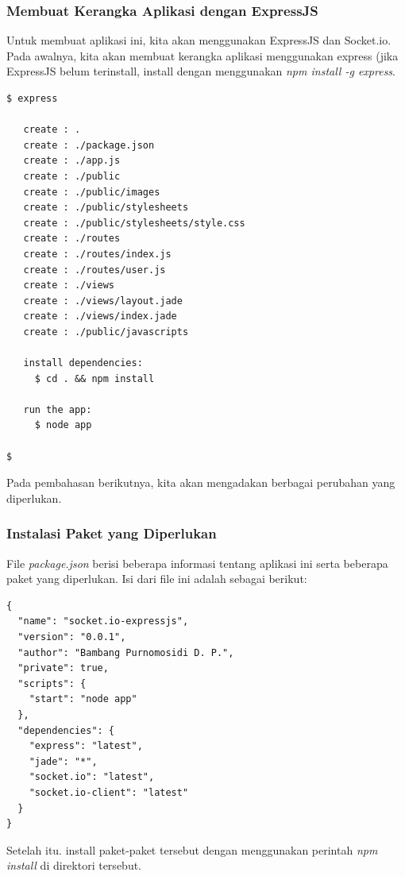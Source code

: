 \subsubsection{Membuat Kerangka Aplikasi dengan ExpressJS}

Untuk membuat aplikasi ini, kita akan menggunakan ExpressJS dan Socket.io. Pada awalnya, kita akan membuat kerangka aplikasi menggunakan express (jika ExpressJS belum terinstall, install dengan menggunakan \textit{npm install -g express}. 

\lstset{language=Bash,caption=Membuat kerangka aplikasi dengan ExpressJS}
\begin{lstlisting}
$ express 

   create : .
   create : ./package.json
   create : ./app.js
   create : ./public
   create : ./public/images
   create : ./public/stylesheets
   create : ./public/stylesheets/style.css
   create : ./routes
   create : ./routes/index.js
   create : ./routes/user.js
   create : ./views
   create : ./views/layout.jade
   create : ./views/index.jade
   create : ./public/javascripts

   install dependencies:
     $ cd . && npm install

   run the app:
     $ node app

$
\end{lstlisting}

Pada pembahasan berikutnya, kita akan mengadakan berbagai perubahan yang diperlukan.

\subsubsection{Instalasi Paket yang Diperlukan}

File \textit{package.json} berisi beberapa informasi tentang aplikasi ini serta beberapa paket yang diperlukan. Isi dari file ini adalah sebagai berikut:

\lstset{language=JavaScript,caption=package.json}
\begin{lstlisting}
{
  "name": "socket.io-expressjs",
  "version": "0.0.1",
  "author": "Bambang Purnomosidi D. P.",
  "private": true,
  "scripts": {
    "start": "node app"
  },
  "dependencies": {
    "express": "latest",
    "jade": "*",
    "socket.io": "latest",
    "socket.io-client": "latest"
  }
}
\end{lstlisting}

Setelah itu. install paket-paket tersebut dengan menggunakan perintah \textit{npm install} di direktori tersebut. 

